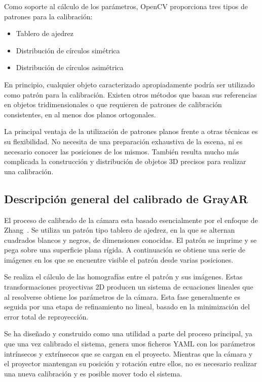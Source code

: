 Como soporte al cálculo de los parámetros, OpenCV proporciona tres tipos de patrones para la calibración:

\begin{itemize}
\item Tablero de ajedrez
\item Distribución de círculos simétrica
\item Distribución de círculos asimétrica 
\end{itemize}

En principio, cualquier objeto caracterizado apropiadamente podría ser utilizado como patrón para la calibración. Existen otros métodos que basan sus referencias en objetos tridimensionales o que requieren de patrones de calibración consistentes, en al menos dos planos ortogonales. 

La principal ventaja de la utilización de patrones planos frente a otras técnicas es su flexibilidad. No necesita de una preparación exhaustiva de la escena, ni es necesario conocer las posiciones de los mismos. También resulta mucho más complicada la construcción y distribución de objetos 3D precisos para realizar una calibración.

\subsection{Descripción general del calibrado de GrayAR}
El proceso de calibrado de la cámara esta basado esencialmente por el enfoque de Zhang~\cite{Zhang}. Se utiliza un patrón tipo tablero de ajedrez, en la que se alternan cuadrados blancos y negros, de dimensiones conocidas. El patrón se imprime y se pega sobre una superficie plana rígida. A continuación se obtiene una serie de imágenes en los que se encuentre visible el patrón desde varias posiciones. 

Se realiza el cálculo de las homografías entre el patrón y sus imágenes. Estas transformaciones proyectivas 2D producen un sistema de ecuaciones lineales que al resolverse obtiene los parámetros de la cámara. Esta fase generalmente es seguida por una etapa de refinamiento no lineal, basado en la minimización del error total de reproyección.

Se ha diseñado y construido como una utilidad a parte del proceso principal, ya que una vez calibrado el sistema, genera unos ficheros YAML con los parámetros intrínsecos y extrínsecos que se cargan en el proyecto. Mientras que la cámara y el proyector mantengan su posición y rotación entre ellos, no es necesario realizar una nueva calibración y es posible mover todo el sistema.

